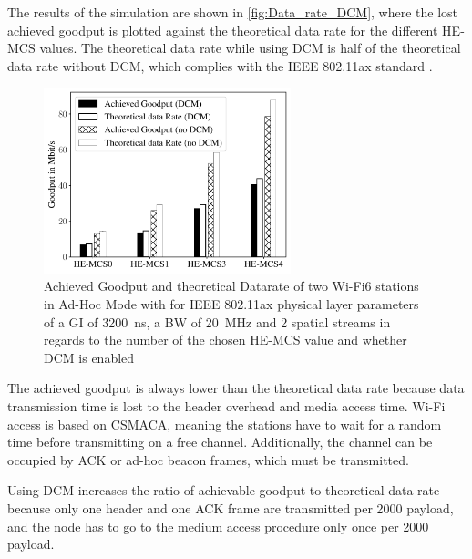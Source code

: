 The results of the simulation are shown in \autoref{fig:Data_rate_DCM}, where the lost achieved goodput is plotted against
the theoretical data rate for the different \ac{HE}-\ac{MCS} values.
The theoretical data rate while using \ac{DCM} is half of the
theoretical data rate without \ac{DCM}, which complies with the IEEE 802.11ax standard \cite{ieee_standard_2021ax}.
\begin{figure}[H]%
   \centering
   \includegraphics[width=0.64\textwidth]{figures/DCM_dataRate_simulation.pdf}
   \caption{Achieved Goodput and theoretical Datarate of two Wi-Fi6 stations in Ad-Hoc Mode with for IEEE 802.11ax physical layer parameters of a \acf{GI} of \SI{3200}{\nano\second}, a \acf{BW} of \SI{20}{\mega\hertz} and \num{2} spatial streams  in regards to the number of the chosen \ac{HE}-\acf{MCS} value and whether \acf{DCM} is enabled}%
   \label{fig:Data_rate_DCM}%
\end{figure}

The achieved goodput is always lower than the theoretical data rate because data transmission time is lost to the header overhead and media access time.
Wi-Fi access is based on \ac{CSMACA}, meaning the stations have to wait for a random time before transmitting on a free channel.
Additionally, the channel can be occupied by ACK or ad-hoc beacon frames, which must be transmitted.

Using \ac{DCM} increases the ratio of achievable goodput to theoretical data rate because only one header and one ACK frame are transmitted per
\SI{2000}{\byte} payload, and the node has to go to the medium access procedure only once per \SI{2000}{\byte} payload.

